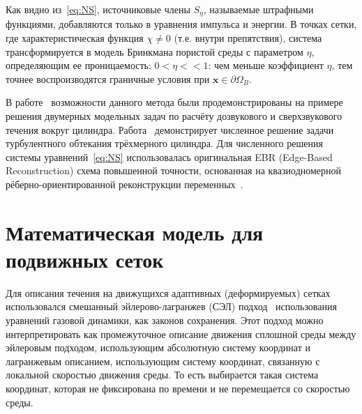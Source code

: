 	Как видно из~\eqref{eq:NS}, источниковые члены $S_\eta$, называемые штрафными функциями, добавляются только в уравнения импульса и энергии. В точках сетки, где характеристическая функция  $\chi\ne0$ (т.е. внутри препятствия), система трансформируется в модель Бринкмана пористой среды с параметром $\eta$, определяющим ее проницаемость: $0<\eta<<1$: чем меньше коэффициент $\eta$, тем точнее воспроизводятся граничные условия при  $\mathbf{x}\in\partial\Omega_B$.

	В работе~\cite{abalakin2015} возможности данного метода были продемонстрированы на примере решения двумерных модельных задач по расчёту дозвукового и сверхзвукового течения вокруг цилиндра.  Работа~\cite{abalakin2018} демонстрирует численное решение задачи турбулентного обтекания трёхмерного цилиндра.
	Для численного решения системы уравнений~\eqref{eq:NS} использовалась оригинальная EBR (Edge-Based Reconstruction) схема повышенной точности, основанная на квазиодномерной рёберно-ориентированной реконструкции переменных~\cite{abalakin2016edge}.
\section{Математическая модель для подвижных сеток}
Для описания течения на движущихся адаптивных (деформируемых) сетках использовался смешанный эйлерово-лагранжев (СЭЛ) подход~\cite{hirt1974arbitrary, golovizin1981} использования уравнений газовой динамики, как законов сохранения. Этот подход можно интерпретировать как промежуточное описание движения сплошной среды между эйлеровым подходом, использующим абсолютную систему координат и лагранжевым описанием, использующим систему координат, связанную с локальной скоростью движения среды. То есть выбирается такая система координат, которая не фиксирована по времени и не перемещается со скоростью среды. 


